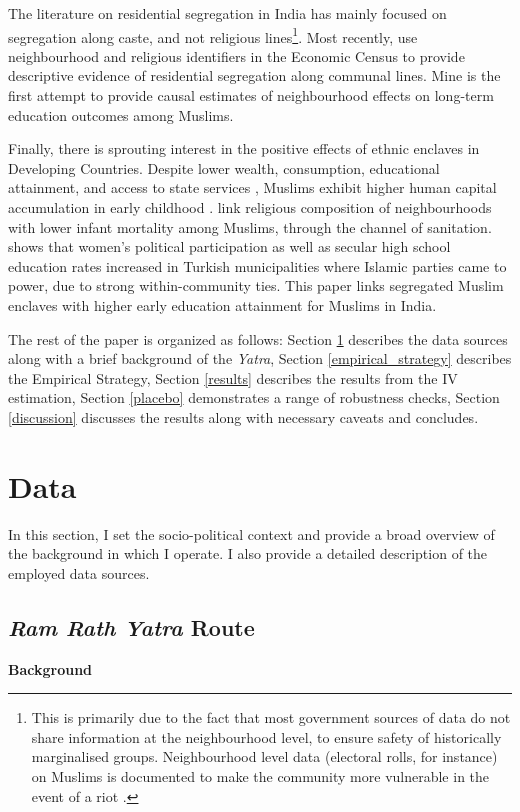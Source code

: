 \documentclass{article}
\begin{document}
The literature on residential segregation in India has mainly focused on segregation along caste, and not religious lines\footnote{This is primarily due to the fact that most government sources of data do not share information at the neighbourhood level, to ensure safety of historically marginalised groups. Neighbourhood level data (electoral rolls, for instance) on Muslims is documented to make the community more vulnerable in the event of a riot \citep{jaffrelot2012muslims}.}. Most recently, \cite{adukia.2018} use neighbourhood and religious identifiers in the Economic Census to provide descriptive evidence of residential segregation along communal lines. Mine is the first attempt to provide causal estimates of neighbourhood effects on long-term education outcomes among Muslims. 

Finally, there is sprouting interest in the positive effects of ethnic enclaves in Developing Countries. Despite lower wealth, consumption, educational attainment, and access to state services \citep{kalai.2019}, Muslims exhibit higher human capital accumulation in early childhood \citep{bhalotra2010puzzle}. \cite{geruso2018neighborhood} link religious composition of neighbourhoods with lower infant mortality among Muslims, through the channel of sanitation. \cite{meyersson2014islamic} shows that women's political participation as well as secular high school education rates increased in Turkish municipalities where Islamic parties came to power, due to strong within-community ties. This paper links segregated Muslim enclaves with higher early education attainment for Muslims in India.

The rest of the paper is organized as follows: Section \ref{data} describes the data sources along with a brief background of the \textit{Yatra}, Section \ref{empirical_strategy} describes the Empirical Strategy, Section \ref{results} describes the results from the IV estimation, Section \ref{placebo} demonstrates a range of robustness checks, Section \ref{discussion} discusses the results along with necessary caveats and concludes. 

\section{Data}\label{data}
In this section, I set the socio-political context and provide a broad overview of the background in which I operate. I also provide a detailed description of the employed data sources. 

\subsection{\textit{Ram Rath Yatra} Route} \label{data_yatra}
\textbf{Background}
\end{document}
